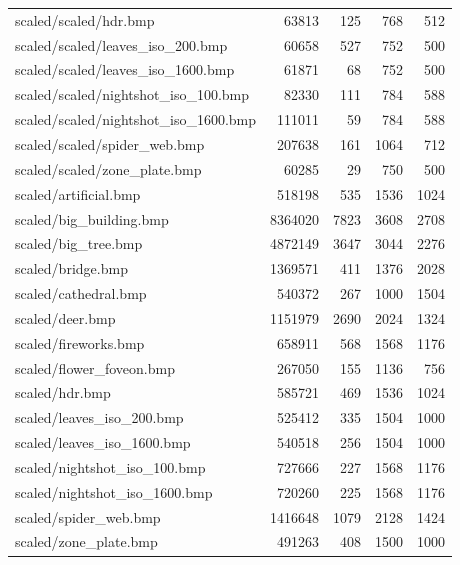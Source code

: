 \documentclass[12pt]{article}
\begin{document}
\begin{table}[!h]
\begin{tabular}{|l|r|r|r|r|}
scaled/scaled/hdr.bmp & 63813 & 125 & 768 & 512 \\ 
scaled/scaled/leaves\_iso\_200.bmp & 60658 & 527 & 752 & 500 \\ 
scaled/scaled/leaves\_iso\_1600.bmp & 61871 & 68 & 752 & 500 \\ 
scaled/scaled/nightshot\_iso\_100.bmp & 82330 & 111 & 784 & 588 \\ 
scaled/scaled/nightshot\_iso\_1600.bmp & 111011 & 59 & 784 & 588 \\ 
scaled/scaled/spider\_web.bmp & 207638 & 161 & 1064 & 712 \\ 
scaled/scaled/zone\_plate.bmp & 60285 & 29 & 750 & 500 \\ 
scaled/artificial.bmp & 518198 & 535 & 1536 & 1024 \\ 
scaled/big\_building.bmp & 8364020 & 7823 & 3608 & 2708 \\ 
scaled/big\_tree.bmp & 4872149 & 3647 & 3044 & 2276 \\ 
scaled/bridge.bmp & 1369571 & 411 & 1376 & 2028 \\ 
scaled/cathedral.bmp & 540372 & 267 & 1000 & 1504 \\ 
scaled/deer.bmp & 1151979 & 2690 & 2024 & 1324 \\ 
scaled/fireworks.bmp & 658911 & 568 & 1568 & 1176 \\ 
scaled/flower\_foveon.bmp & 267050 & 155 & 1136 & 756 \\ 
scaled/hdr.bmp & 585721 & 469 & 1536 & 1024 \\ 
scaled/leaves\_iso\_200.bmp & 525412 & 335 & 1504 & 1000 \\ 
scaled/leaves\_iso\_1600.bmp & 540518 & 256 & 1504 & 1000 \\ 
scaled/nightshot\_iso\_100.bmp & 727666 & 227 & 1568 & 1176 \\ 
scaled/nightshot\_iso\_1600.bmp & 720260 & 225 & 1568 & 1176 \\ 
scaled/spider\_web.bmp & 1416648 & 1079 & 2128 & 1424 \\ 
scaled/zone\_plate.bmp & 491263 & 408 & 1500 & 1000 \\
\hline
\end{tabular}
\end{table}
\end{document}
